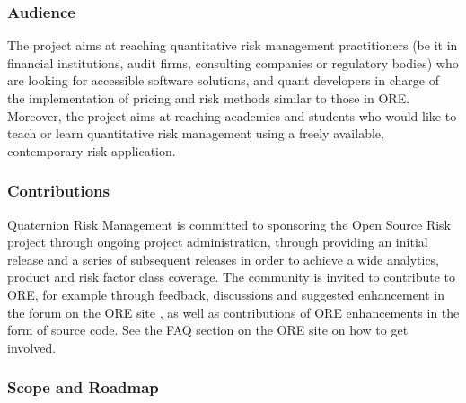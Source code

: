 \documentclass[12pt, a4paper]{article}
\begin{document}
\subsubsection*{Audience}
The project aims at reaching quantitative risk ma\-nage\-ment practitioners (be it in financial institutions, audit
firms, consulting companies or regulatory bodies) who are looking for accessible software solutions, and quant
developers in charge of the implementation of pricing and risk methods similar to those in ORE. Moreover, the project
aims at reaching academics and students who would like to teach or learn quantitative risk management using a freely
available, contemporary risk application.

\subsubsection*{Contributions}
Quaternion Risk Management \cite{QRM} is committed to sponsoring the Open Source Risk project through ongoing project
administration, through providing an initial release and a series of subsequent releases in order to achieve a wide
analytics, product and risk factor class coverage. The community is invited to contribute to ORE, for example through
feedback, discussions and suggested enhancement in the forum on the ORE site \cite{ORE}, as well as contributions of ORE
enhancements in the form of source code. See the FAQ section on the ORE site \cite{ORE} on how to get involved.

\subsubsection*{Scope and Roadmap}
\end{document}
